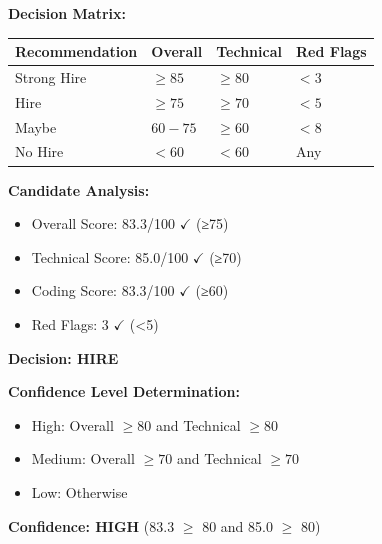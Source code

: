 \documentclass[12pt,a4paper]{article}
\begin{document}
\begin{tcolorbox}[colback=primaryblue!5,colframe=primaryblue,title=\textbf{STEP 6: Determine Hiring Recommendation}]
\textbf{Decision Matrix:}

\begin{table}[h!]
\centering
\begin{tabular}{|l|l|l|l|}
\hline
\textbf{Recommendation} & \textbf{Overall} & \textbf{Technical} & \textbf{Red Flags} \\
\hline
Strong Hire & $\geq 85$ & $\geq 80$ & $< 3$ \\
Hire & $\geq 75$ & $\geq 70$ & $< 5$ \\
Maybe & $60-75$ & $\geq 60$ & $< 8$ \\
No Hire & $< 60$ & $< 60$ & Any \\
\hline
\end{tabular}
\end{table}

\textbf{Candidate Analysis:}
\begin{itemize}
    \item Overall Score: 83.3/100 $\checkmark$ (≥75)
    \item Technical Score: 85.0/100 $\checkmark$ (≥70)
    \item Coding Score: 83.3/100 $\checkmark$ (≥60)
    \item Red Flags: 3 $\checkmark$ (<5)
\end{itemize}

\textbf{Decision: HIRE}

\textbf{Confidence Level Determination:}
\begin{itemize}
    \item High: Overall $\geq 80$ and Technical $\geq 80$
    \item Medium: Overall $\geq 70$ and Technical $\geq 70$
    \item Low: Otherwise
\end{itemize}

\textbf{Confidence: HIGH} (83.3 $\geq$ 80 and 85.0 $\geq$ 80)
\end{tcolorbox}

\newpage
\end{document}
